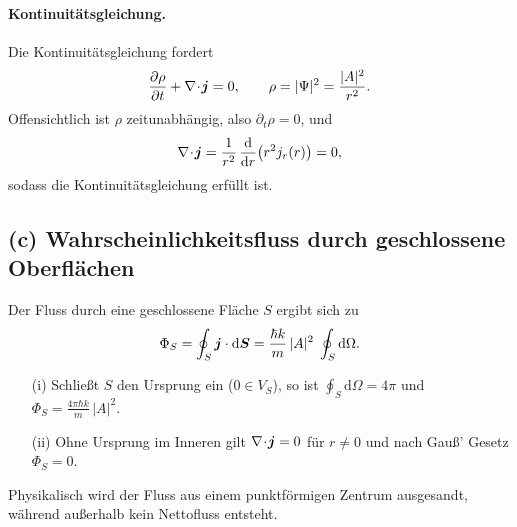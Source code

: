 \documentclass[a4paper,11pt]{article}
\begin{document}
\paragraph{Kontinuitätsgleichung.}
Die Kontinuitätsgleichung fordert
\[
\frac{\partial \rho}{\partial t} + \nabla\!\cdot\!\vb*{j} = 0,
\qquad
\rho = \lvert \Psi\rvert^2 = \frac{\lvert A\rvert^2}{r^2}.
\]
Offensichtlich ist \(\rho\) zeitunabhängig, also \(\partial_t\rho=0\), und
\[
\nabla\!\cdot\!\vb*{j}
= \frac{1}{r^2}\,\frac{\mathrm{d}}{\mathrm{d}r}\bigl(r^2 j_r(r)\bigr)
= 0,
\]
sodass die Kontinuitätsgleichung erfüllt ist.

\subsection*{(c) Wahrscheinlichkeitsfluss durch geschlossene Oberflächen}

Der Fluss durch eine geschlossene Fläche \(S\) ergibt sich zu
\[
\Phi_S
= \oint_S \vb*{j}\cdot \mathrm{d}\vb*{S}
= \frac{\hbar k}{m}\,\lvert A\rvert^2
\;\oint_S \mathrm{d}\Omega.
\]
\begin{itemize}
  \item[(i)] Schließt \(S\) den Ursprung ein (\(0\in V_S\)), so ist
  \(\oint_S \mathrm{d}\Omega = 4\pi\) und
  \(\Phi_S = \frac{4\pi\hbar k}{m}\,\lvert A\rvert^2\).
  \item[(ii)] Ohne Ursprung im Inneren gilt \(\nabla\!\cdot\!\vb*{j}=0\) für \(r\neq0\)
  und nach Gauß’ Gesetz \(\Phi_S=0\).
\end{itemize}

Physikalisch wird der Fluss aus einem punktförmigen Zentrum ausgesandt, während
außerhalb kein Nettofluss entsteht.
\end{document}
